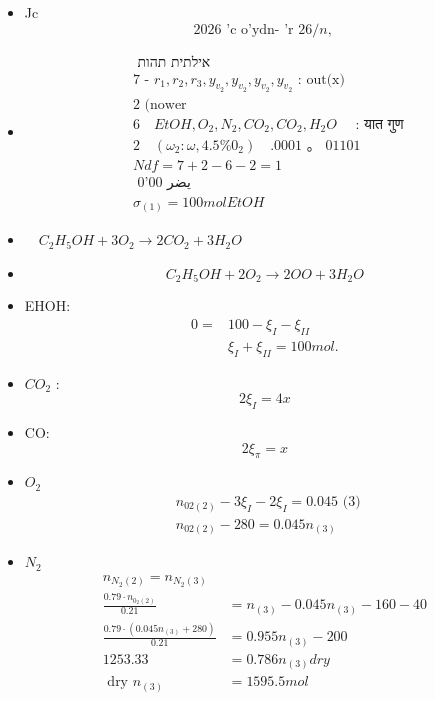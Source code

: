 \documentclass[12pt]{article}
\begin{document}

\begin{itemize}\item[1.] Jc
\[
2026 \text { 'c o'ydn- 'r } 26 / n \text {, }
\]
\item[]
\[
\begin{aligned}
& \text { אילתית תהות } \\
& 7 \text { - } r_{1}, r_{2}, r_{3}, y_{v_{2}}, y_{v_{2}}, y_{v_{2}}, y_{v_{2}} \text { : out(x) } \\
& 2 \text { (nower } \\
& 6 \quad EtOH, O_{2}, N_{2}, CO_{2}, CO_{2}, H_{2} O \quad \text { : यात गुण } \\
& 2 \quad\left(\omega_{2}: \omega, 4.5 \% 0_{2}\right) \quad .0001 \text { 。 } 01101 \\
& N d f=7+2-6-2=1 \\
& \text { 0'00 يضر } \\
& \sigma_{(1)}=100 mol EtOH
\end{aligned}
\]
\item[I)] \(\quad C _{2} H _{5} OH +3 O _{2} \longrightarrow 2 CO _{2}+3 H _{2} O\)
\item[II)]
\[
C_{2} H_{5} OH+2 O_{2} \rightarrow 2 OO+3 H_{2} O
\]
\item[] EHOH:
\[
\begin{aligned}
0= & 100-\xi_{I}-\xi_{I I} \\
& \xi_{I}+\xi_{I I}=100 mol .
\end{aligned}
\]
\item[] \(CO _{2}\) :
\[
2 \xi_{I}=4 x
\]
\item[] CO:
\[
2 \xi_{\pi}=x
\]
\item[] \(O _{2}\)
\[
\begin{aligned}
& n_{02(2)}-3 \xi_{I}-2 \xi_{I}=0.045 \text { (3) } \\
& n_{02(2)}-280=0.045 n_{(3)}
\end{aligned}
\]
\item[] \(N _{2}\)
\[
\begin{aligned}
n_{N_{2}(2)}=n_{N_{2}(3)} & \\
\frac{0.79 \cdot n_{0_{2}(2)}}{0.21} & =n_{(3)}-0.045 n_{(3)}-160-40 \\
\frac{0.79 \cdot\left(0.045 n_{(3)}+280\right)}{0.21} & =0.955 n_{(3)}-200 \\
1253.33 & =0.786 n_{(3)} dry \\
\text { dry } n_{(3)} & =1595.5 mol
\end{aligned}
\]
\end{itemize}
\end{document}

